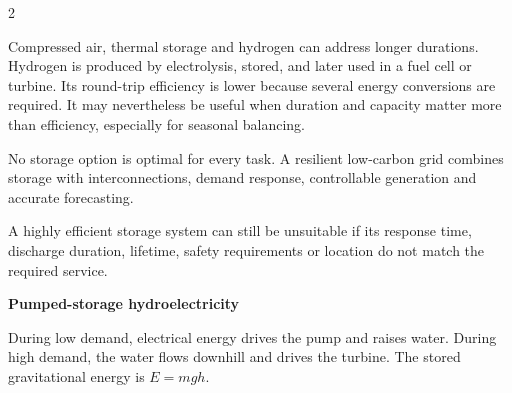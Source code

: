 \begin{multicols}{2}
\begin{ecarticle}
Compressed air, thermal storage and hydrogen can address longer durations. Hydrogen is produced by electrolysis, stored, and later used in a fuel cell or turbine. Its round-trip efficiency is lower because several energy conversions are required. It may nevertheless be useful when duration and capacity matter more than efficiency, especially for seasonal balancing.

No storage option is optimal for every task. A resilient low-carbon grid combines storage with interconnections, demand response, controllable generation and accurate forecasting.
\end{ecarticle}

\begin{tcolorbox}[title=\sffamily\bfseries Did You Know?,colback=yellow!10,colframe=ECOrange]
A highly efficient storage system can still be unsuitable if its response time, discharge duration, lifetime, safety requirements or location do not match the required service.
\end{tcolorbox}

\columnbreak

\begin{engineeringfocus}
\textbf{Pumped-storage hydroelectricity}
\begin{center}
\end{center}
During low demand, electrical energy drives the pump and raises water. During high demand, the water flows downhill and drives the turbine. The stored gravitational energy is $E=mgh$.
\end{engineeringfocus}


\end{multicols}
